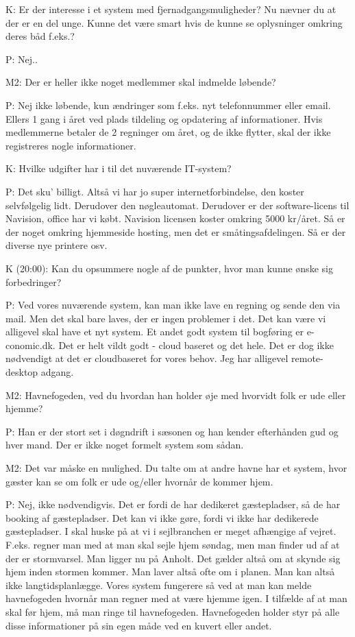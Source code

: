 K: Er der interesse i et system med fjernadgangsmuligheder? Nu nævner du at der er en del unge. Kunne det være smart hvis de kunne se oplysninger omkring deres båd f.eks.?

P: Nej..

M2: Der er heller ikke noget medlemmer skal indmelde løbende?

P: Nej ikke løbende, kun ændringer som f.eks. nyt telefonnummer eller email. Ellers 1 gang i året ved plads tildeling og opdatering af informationer. Hvis medlemmerne betaler de 2 regninger om året, og de ikke flytter, skal der ikke registreres nogle informationer.

K: Hvilke udgifter har i til det nuværende IT-system?

P: Det sku' billigt. Altså vi har jo super internetforbindelse, den koster selvfølgelig lidt. Derudover den nøgleautomat. Derudover er der software-licens til Navision, office har vi købt. Navision licensen koster omkring 5000 kr/året. Så er der noget omkring hjemmeside hosting, men det er småtingsafdelingen. Så er der diverse nye printere osv.


K (20:00): Kan du opsummere nogle af de punkter, hvor man kunne ønske sig forbedringer?

P: Ved vores nuværende system, kan man ikke lave en regning og sende den via mail. Men det skal bare laves, der er ingen problemer i det. Det kan være vi alligevel skal have et nyt system. Et andet godt system til bogføring er e-conomic.dk. Det er helt vildt godt - cloud baseret og det hele. Det er dog ikke nødvendigt at det er cloudbaseret for vores behov. Jeg har alligevel remote-desktop adgang.

M2: Havnefogeden, ved du hvordan han holder øje med hvorvidt folk er ude eller hjemme?

P: Han er der stort set i døgndrift i sæsonen og han kender efterhånden gud og hver mand. Der er ikke noget formelt system som sådan.

M2: Det var måske en mulighed. Du talte om at andre havne har et system, hvor gæster kan se om folk er ude og/eller hvornår de kommer hjem.

P: Nej, ikke nødvendigvis. Det er fordi de har dedikeret gæstepladser, så de har booking af gæstepladser. Det kan vi ikke gøre, fordi vi ikke har dedikerede gæstepladser. I skal huske på at vi i sejlbranchen er meget afhængige af vejret. F.eks. regner man med at man skal sejle hjem søndag, men man finder ud af at der er stormvarsel. Man ligger nu på Anholt. Det gælder altså om at skynde sig hjem inden stormen kommer. Man laver altså ofte om i planen. Man kan altså ikke langtidsplanlægge. Vores system fungerere så ved at man kan melde havnefogeden hvornår man regner med at være hjemme igen. I tilfælde af at man skal før hjem, må man ringe til havnefogeden. Havnefogeden holder styr på alle disse informationer på sin egen måde ved en kuvert eller andet.

